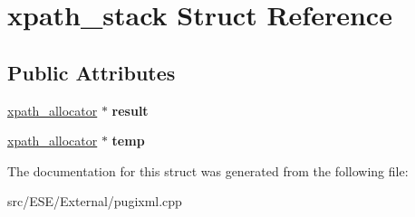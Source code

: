 \hypertarget{structxpath__stack}{\section{xpath\-\_\-stack Struct Reference}
\label{structxpath__stack}
}
\subsection*{Public Attributes}
\begin{DoxyCompactItemize}
\item 
\hypertarget{structxpath__stack_adce164b779cbb3d1bc093a772067ea7e}{\hyperlink{classxpath__allocator}{xpath\-\_\-allocator} $\ast$ {\bfseries result}}\label{structxpath__stack_adce164b779cbb3d1bc093a772067ea7e}

\item 
\hypertarget{structxpath__stack_a48edd585dfb910c6c016559f07fea0d8}{\hyperlink{classxpath__allocator}{xpath\-\_\-allocator} $\ast$ {\bfseries temp}}\label{structxpath__stack_a48edd585dfb910c6c016559f07fea0d8}

\end{DoxyCompactItemize}


The documentation for this struct was generated from the following file\-:\begin{DoxyCompactItemize}
\item 
src/\-E\-S\-E/\-External/pugixml.\-cpp\end{DoxyCompactItemize}
